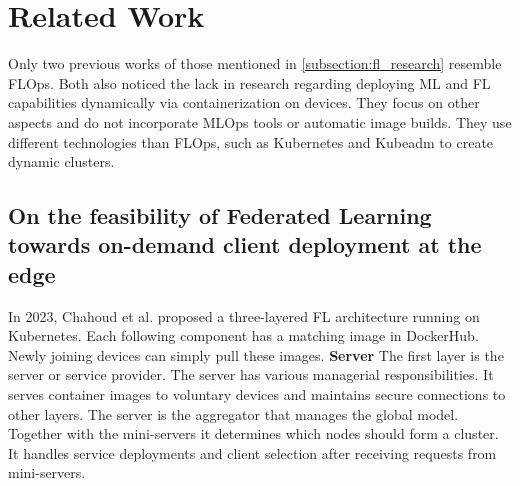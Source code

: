 \section{Related Work}

Only two previous works \cite{paper:fl_toward_on_demand_client_deployment_at_edge, paper:global_fl_platform_for_iot} of those mentioned in \ref{subsection:fl_research} resemble FLOps.
Both also noticed the lack in research regarding deploying ML and FL capabilities dynamically via containerization on devices.
They focus on other aspects and do not incorporate MLOps tools or automatic image builds.
They use different technologies than FLOps, such as Kubernetes and Kubeadm to create dynamic clusters.

\subsection{On the feasibility of Federated Learning towards on-demand client deployment at the edge}
In 2023, Chahoud et al. \cite{paper:fl_toward_on_demand_client_deployment_at_edge} proposed a three-layered FL architecture running on Kubernetes.
Each following component has a matching image in DockerHub.
Newly joining devices can simply pull these images.
\vspace{5mm}
\newline
\textbf{Server}\newline
The first layer is the server or service provider.
The server has various managerial responsibilities.
It serves container images to voluntary devices and maintains secure connections to other layers.
The server is the aggregator that manages the global model.
Together with the mini-servers it determines which nodes should form a cluster.
It handles service deployments and client selection after receiving requests from mini-servers.

